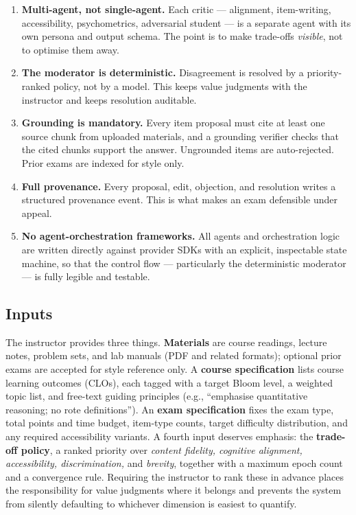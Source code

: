 \documentclass[
  11pt,
  letterpaper,
]{article}
\providecommand{\tightlist}{%
  \setlength{\itemsep}{0pt}\setlength{\parskip}{0pt}}
\begin{document}
\begin{enumerate}
\def\labelenumi{\arabic{enumi}.}
\tightlist
\item
  \textbf{Multi-agent, not single-agent.} Each critic --- alignment,
  item-writing, accessibility, psychometrics, adversarial student --- is
  a separate agent with its own persona and output schema. The point is
  to make trade-offs \emph{visible}, not to optimise them away.
\item
  \textbf{The moderator is deterministic.} Disagreement is resolved by a
  priority-ranked policy, not by a model. This keeps value judgments
  with the instructor and keeps resolution auditable.
\item
  \textbf{Grounding is mandatory.} Every item proposal must cite at
  least one source chunk from uploaded materials, and a grounding
  verifier checks that the cited chunks support the answer. Ungrounded
  items are auto-rejected. Prior exams are indexed for style only.
\item
  \textbf{Full provenance.} Every proposal, edit, objection, and
  resolution writes a structured provenance event. This is what makes an
  exam defensible under appeal.
\item
  \textbf{No agent-orchestration frameworks.} All agents and
  orchestration logic are written directly against provider SDKs with an
  explicit, inspectable state machine, so that the control flow ---
  particularly the deterministic moderator --- is fully legible and
  testable.
\end{enumerate}

\subsection{Inputs}\label{inputs}

The instructor provides three things. \textbf{Materials} are course
readings, lecture notes, problem sets, and lab manuals (PDF and related
formats); optional prior exams are accepted for style reference only. A
\textbf{course specification} lists course learning outcomes (CLOs),
each tagged with a target Bloom level, a weighted topic list, and
free-text guiding principles (e.g., ``emphasise quantitative reasoning;
no rote definitions''). An \textbf{exam specification} fixes the exam
type, total points and time budget, item-type counts, target difficulty
distribution, and any required accessibility variants. A fourth input
deserves emphasis: the \textbf{trade-off policy}, a ranked priority over
\emph{content fidelity, cognitive alignment, accessibility,
discrimination,} and \emph{brevity}, together with a maximum epoch count
and a convergence rule. Requiring the instructor to rank these in
advance places the responsibility for value judgments where it belongs
and prevents the system from silently defaulting to whichever dimension
is easiest to quantify.
\end{document}
